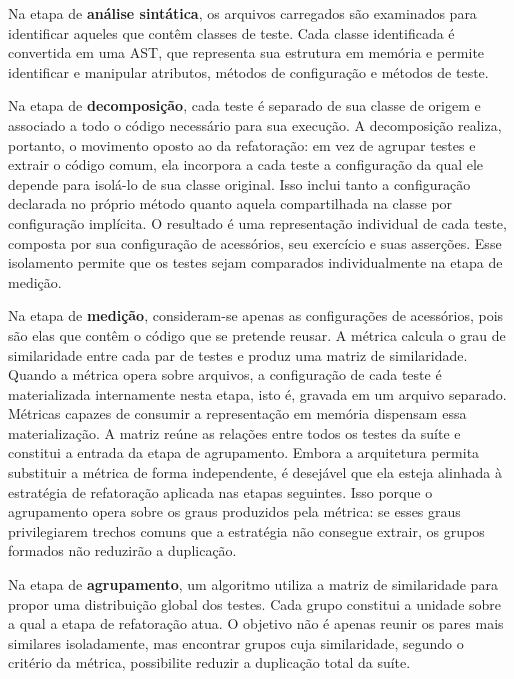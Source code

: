 Na etapa de \textbf{análise sintática}, os arquivos carregados são examinados para identificar aqueles que contêm classes de teste. Cada classe identificada é convertida em uma AST, que representa sua estrutura em memória e permite identificar e manipular atributos, métodos de configuração e métodos de teste.

Na etapa de \textbf{decomposição}, cada teste é separado de sua classe de origem e associado a todo o código necessário para sua execução. A decomposição realiza, portanto, o movimento oposto ao da refatoração: em vez de agrupar testes e extrair o código comum, ela incorpora a cada teste a configuração da qual ele depende para isolá-lo de sua classe original. Isso inclui tanto a configuração declarada no próprio método quanto aquela compartilhada na classe por configuração implícita. O resultado é uma representação individual de cada teste, composta por sua configuração de acessórios, seu exercício e suas asserções. Esse isolamento permite que os testes sejam comparados individualmente na etapa de medição.

Na etapa de \textbf{medição}, consideram-se apenas as configurações de acessórios, pois são elas que contêm o código que se pretende reusar. A métrica calcula o grau de similaridade entre cada par de testes e produz uma matriz de similaridade. Quando a métrica opera sobre arquivos, a configuração de cada teste é materializada internamente nesta etapa, isto é, gravada em um arquivo separado. Métricas capazes de consumir a representação em memória dispensam essa materialização. A matriz reúne as relações entre todos os testes da suíte e constitui a entrada da etapa de agrupamento. Embora a arquitetura permita substituir a métrica de forma independente, é desejável que ela esteja alinhada à estratégia de refatoração aplicada nas etapas seguintes. Isso porque o agrupamento opera sobre os graus produzidos pela métrica: se esses graus privilegiarem trechos comuns que a estratégia não consegue extrair, os grupos formados não reduzirão a duplicação.

Na etapa de \textbf{agrupamento}, um algoritmo utiliza a matriz de similaridade para propor uma distribuição global dos testes. Cada grupo constitui a unidade sobre a qual a etapa de refatoração atua. O objetivo não é apenas reunir os pares mais similares isoladamente, mas encontrar grupos cuja similaridade, segundo o critério da métrica, possibilite reduzir a duplicação total da suíte.

